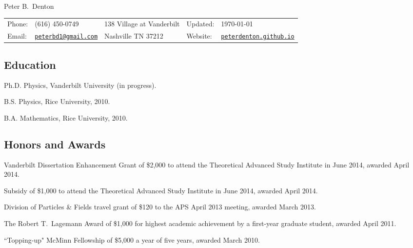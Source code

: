 \documentclass[letterpaper]{article}
\def\name{Peter B.~Denton}
\renewenvironment{itemize}{
\begin{list}{}{
\setlength{\leftmargin}{1.5em}
}
}{
\end{list}
}
\begin{document}
{\huge \name}

\vspace{0.1in}

\begin{tabular}{ll|l|ll}
Phone: & (616) 450-0749 & 138 Village at Vanderbilt & Updated: & \today\\
Email: & \href{mailto:peterbd1@gmail.com}{\tt peterbd1@gmail.com} & Nashville TN 37212 & Website: & 
\href{http://peterdenton.github.io}{\tt peterdenton.github.io}
\end{tabular}

\subsection*{Education}
\begin{itemize}
\item Ph.D. Physics, Vanderbilt University (in progress).
\item B.S. Physics, Rice University, 2010.
\item B.A. Mathematics, Rice University, 2010.
\end{itemize}

\subsection*{Honors and Awards}
\begin{itemize}
\item Vanderbilt Dissertation Enhancement Grant of \$2,000 to attend the Theoretical Advanced Study Institute in
June 2014, awarded April 2014.
\item Subsidy of \$1,000 to attend the Theoretical Advanced Study Institute in June 2014, awarded April 2014.
\item Division of Particles \& Fields travel grant of \$120 to the APS April 2013 meeting, awarded March 2013.
\item The Robert T.~Lagemann Award of \$1,000 for highest academic achievement by a first-year graduate student, awarded April 2011.
\item ``Topping-up" McMinn Fellowship of \$5,000 a year of five years, awarded March 2010.
\end{itemize}
\end{document}
